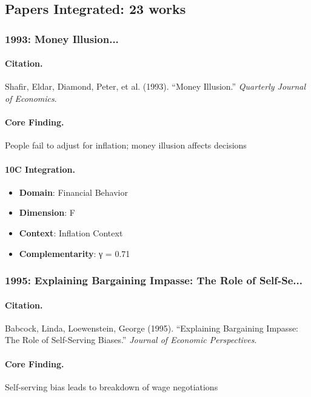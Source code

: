 \subsection{Papers Integrated: 23 works}

\subsubsection{1993: Money Illusion...}

\paragraph{Citation.}
Shafir, Eldar, Diamond, Peter, et al. (1993). ``Money Illusion.''
\textit{Quarterly Journal of Economics}.

\paragraph{Core Finding.}
People fail to adjust for inflation; money illusion affects decisions

\paragraph{10C Integration.}
\begin{itemize}[nosep]
  \item \textbf{Domain}: Financial Behavior
  \item \textbf{Dimension}: F
  \item \textbf{Context}: Inflation Context
  \item \textbf{Complementarity}: γ = 0.71
\end{itemize}

\subsubsection{1995: Explaining Bargaining Impasse: The Role of Self-Se...}

\paragraph{Citation.}
Babcock, Linda, Loewenstein, George (1995). ``Explaining Bargaining Impasse: The Role of Self-Serving Biases.''
\textit{Journal of Economic Perspectives}.

\paragraph{Core Finding.}
Self-serving bias leads to breakdown of wage negotiations

